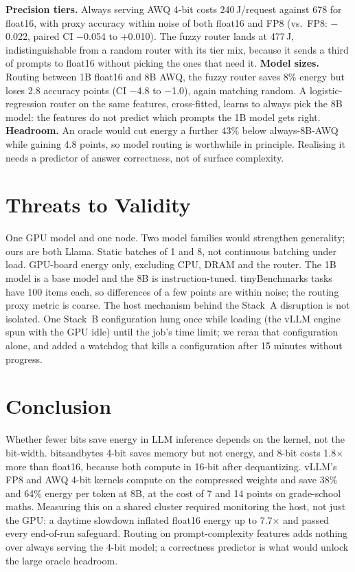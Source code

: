 \documentclass[conference]{IEEEtran}
\begin{document}
\textbf{Precision tiers.} Always serving AWQ 4-bit costs 240\,J/request against 678 for float16, with proxy accuracy within noise of both float16 and FP8 (vs.\ FP8: $-$0.022, paired CI $-$0.054 to $+$0.010). The fuzzy router lands at 477\,J, indistinguishable from a random router with its tier mix, because it sends a third of prompts to float16 without picking the ones that need it.
\textbf{Model sizes.} Routing between 1B float16 and 8B AWQ, the fuzzy router saves 8\% energy but loses 2.8 accuracy points (CI $-$4.8 to $-$1.0), again matching random. A logistic-regression router on the same features, cross-fitted, learns to always pick the 8B model: the features do not predict which prompts the 1B model gets right.
\textbf{Headroom.} An oracle would cut energy a further 43\% below always-8B-AWQ while gaining 4.8 points, so model routing is worthwhile in principle. Realising it needs a predictor of answer correctness, not of surface complexity.

\section{Threats to Validity}
One GPU model and one node. Two model families would strengthen generality; ours are both Llama. Static batches of 1 and 8, not continuous batching under load. GPU-board energy only, excluding CPU, DRAM and the router. The 1B model is a base model and the 8B is instruction-tuned. tinyBenchmarks tasks have 100 items each, so differences of a few points are within noise; the routing proxy metric is coarse. The host mechanism behind the Stack~A disruption is not isolated. One Stack~B configuration hung once while loading (the vLLM engine spun with the GPU idle) until the job's time limit; we reran that configuration alone, and added a watchdog that kills a configuration after 15 minutes without progress.

\section{Conclusion}
Whether fewer bits save energy in LLM inference depends on the kernel, not the bit-width. bitsandbytes 4-bit saves memory but not energy, and 8-bit costs 1.8$\times$ more than float16, because both compute in 16-bit after dequantizing. vLLM's FP8 and AWQ 4-bit kernels compute on the compressed weights and save 38\% and 64\% energy per token at 8B, at the cost of 7 and 14 points on grade-school maths. Measuring this on a shared cluster required monitoring the host, not just the GPU: a daytime slowdown inflated float16 energy up to 7.7$\times$ and passed every end-of-run safeguard. Routing on prompt-complexity features adds nothing over always serving the 4-bit model; a correctness predictor is what would unlock the large oracle headroom.



\end{document}

